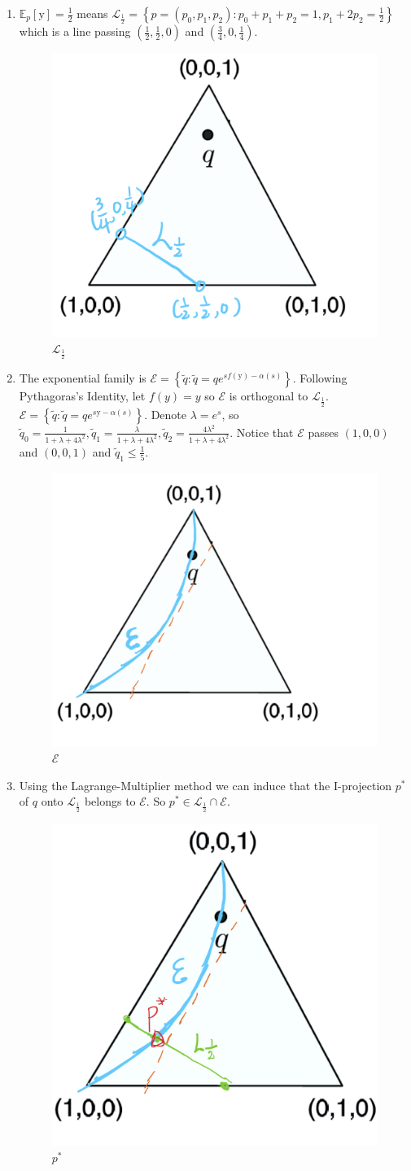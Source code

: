 \documentclass[a4paper]{article}
\begin{document}
\begin{enumerate}
\begin{enumerate}
  \item $\mathbb{E}_p[\mathrm{y}] = \frac{1}{2}$ means $\mathcal{L}_{\frac{1}{2}} = \left\{p = (p_0,p_1,p_2): p_0+p_1+p_2 = 1,p_1+2p_2 = \frac{1}{2}\right\}$ which is a line passing $(\frac{1}{2},\frac{1}{2},0)$ and $(\frac{3}{4},0,\frac{1}{4})$. 

  \begin{figure}[!htbp]
    \centering
    \includegraphics[width = 0.3\linewidth]{3-2.jpg}
    \caption{$\mathcal{L}_{\frac 1 2}$}
  \end{figure}

  \item The exponential family is $\mathcal{E}=\left\{\tilde{q}: \tilde{q}=q e^{s f(\mathrm{y})-\alpha(s)}\right\}$. Following Pythagoras's Identity, let $f(y) = y$ so $\mathcal{E}$ is orthogonal to $\mathcal{L}_{\frac{1}{2}}$.  $\mathcal{E}=\left\{\tilde{q}: \tilde{q}=q e^{s \mathrm{y}-\alpha(s)}\right\}$. Denote $\lambda = e^s$, so $\tilde{q}_0 = \frac{1}{1+\lambda + 4\lambda^2},\tilde{q}_1 = \frac{\lambda}{1+\lambda + 4\lambda^2},\tilde{q}_2 = \frac{4\lambda^2}{1+\lambda + 4\lambda^2}$. Notice that $\mathcal{E}$ passes $(1,0,0)$ and $(0,0,1)$ and $\tilde{q}_1\leqslant \frac{1}{5}$.
  

  \begin{figure}[!htbp]
    \centering
    \includegraphics[width = 0.3\linewidth]{3-3.jpg}
    \caption{$\mathcal{E}$}
  \end{figure}

  \item Using the Lagrange-Multiplier method we can induce that the I-projection $p^*$ of $q$ onto $\mathcal{L}_{\frac 1 2}$ belongs to $\mathcal{E}$. So $p^* \in \mathcal{L}_{\frac 1 2} \cap \mathcal{E}$.
  
  \begin{figure}[!htbp]
    \centering
    \includegraphics[width = 0.3\linewidth]{3-4.jpg}
    \caption{$p^*$}
  \end{figure}


\end{enumerate}
\end{enumerate}
\end{document}
